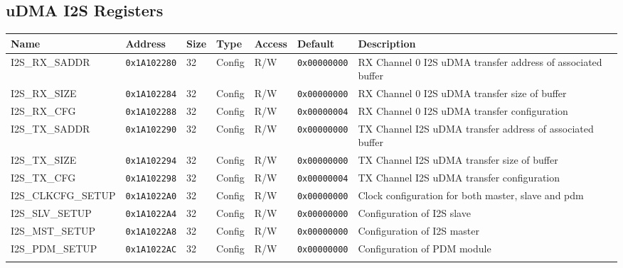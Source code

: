
\subsection{uDMA I2S Registers}
{\small
\begin{tabularx}{\textwidth}{|l|l|l|l|l|l|X|}
  \hline
  \textbf{Name} & \textbf{Address}  & \textbf{Size} & \textbf{Type} & \textbf{Access} & \textbf{Default} & \textbf{Description} \\
  \hline
  I2S\_RX\_SADDR & \texttt{0x1A102280} & 32 & Config & R/W & \texttt{0x00000000} & RX Channel 0 I2S uDMA transfer address of associated buffer\\
  \hline
  I2S\_RX\_SIZE & \texttt{0x1A102284} & 32 & Config & R/W & \texttt{0x00000000} & RX Channel 0 I2S uDMA transfer size of buffer\\
  \hline
  I2S\_RX\_CFG & \texttt{0x1A102288} & 32 & Config & R/W & \texttt{0x00000004} & RX Channel 0 I2S uDMA transfer configuration\\
  \hline
  I2S\_TX\_SADDR & \texttt{0x1A102290} & 32 & Config & R/W & \texttt{0x00000000} &  TX Channel I2S uDMA transfer address of associated buffer\\
  \hline
  I2S\_TX\_SIZE & \texttt{0x1A102294} & 32 & Config & R/W & \texttt{0x00000000} &  TX Channel I2S uDMA transfer size of buffer\\
  \hline
  I2S\_TX\_CFG & \texttt{0x1A102298} & 32 & Config & R/W & \texttt{0x00000004} &  TX Channel I2S uDMA transfer configuration\\
  \hline
  I2S\_CLKCFG\_SETUP & \texttt{0x1A1022A0} & 32 & Config & R/W & \texttt{0x00000000} & Clock configuration for both master, slave and pdm\\
  \hline
  I2S\_SLV\_SETUP & \texttt{0x1A1022A4} & 32 & Config & R/W & \texttt{0x00000000} & Configuration of I2S slave\\
  \hline
  I2S\_MST\_SETUP & \texttt{0x1A1022A8} & 32 & Config & R/W & \texttt{0x00000000} & Configuration of I2S master\\
  \hline
  I2S\_PDM\_SETUP & \texttt{0x1A1022AC} & 32 & Config & R/W & \texttt{0x00000000} & Configuration of PDM module\\
  \hline
  \caption{uDMA I2S}
\end{tabularx}
}




